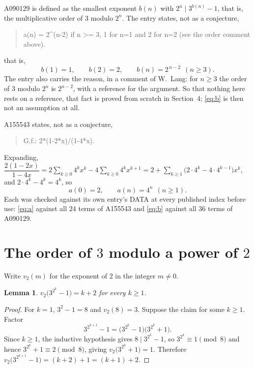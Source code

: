 \documentclass[11pt,a4paper]{article}
\theoremstyle{plain}
\newtheorem{lemma}[theorem]{Lemma}
\theoremstyle{definition}
\begin{document}
A090129 is defined as the smallest exponent $b(n)$ with $2^{n}\mid 3^{b(n)}-1$, that is,
the multiplicative order of $3$ modulo $2^{n}$. The entry states, not as a conjecture,
\begin{quote}\small
a(n) = 2\^{}(n-2) if n >= 3, 1 for n=1 and 2 for n=2 (see the order comment above).
\end{quote}
that is,
\begin{equation}\label{eq:b}
b(1)=1,\qquad b(2)=2,\qquad b(n)=2^{\,n-2}\ \ (n\ge3).
\end{equation}
The entry also carries the reason, in a comment of W.~Lang: for $n\ge3$ the order of $3$
modulo $2^{n}$ is $2^{n-2}$, with a reference for the argument. So that nothing here rests
on a reference, that fact is proved from scratch in Section~4; \eqref{eq:b} is then not an
assumption at all.

A155543 states, not as a conjecture,
\begin{quote}\small
G.f.: 2*(1-2*x)/(1-4*x).
\end{quote}
Expanding, $\dfrac{2(1-2x)}{1-4x}=2\sum_{k\ge0}4^{k}x^{k}-4\sum_{k\ge0}4^{k}x^{k+1}
=2+\sum_{k\ge1}\bigl(2\cdot4^{k}-4\cdot4^{k-1}\bigr)x^{k}$, and
$2\cdot4^{k}-4^{k}=4^{k}$, so
\begin{equation}\label{eq:a}
a(0)=2,\qquad a(n)=4^{n}\ \ (n\ge1).
\end{equation}
Each was checked against its own entry's DATA at every published index before use:
\eqref{eq:a} against all $24$ terms of A155543 and \eqref{eq:b} against all
$36$ terms of A090129.

\section{The order of $3$ modulo a power of $2$}

Write $v_2(m)$ for the exponent of $2$ in the integer $m\ne0$.

\begin{lemma}\label{lem:val}
$v_2\bigl(3^{2^{k}}-1\bigr)=k+2$ for every $k\ge1$.
\end{lemma}

\begin{proof}
For $k=1$, $3^{2}-1=8$ and $v_2(8)=3$. Suppose the claim for some $k\ge1$. Factor
\[
3^{2^{k+1}}-1=\bigl(3^{2^{k}}-1\bigr)\bigl(3^{2^{k}}+1\bigr).
\]
Since $k\ge1$, the inductive hypothesis gives $8\mid 3^{2^{k}}-1$, so
$3^{2^{k}}\equiv1\pmod 8$ and hence $3^{2^{k}}+1\equiv2\pmod 8$, giving
$v_2\bigl(3^{2^{k}}+1\bigr)=1$. Therefore
$v_2\bigl(3^{2^{k+1}}-1\bigr)=(k+2)+1=(k+1)+2$.
\end{proof}
\end{document}
